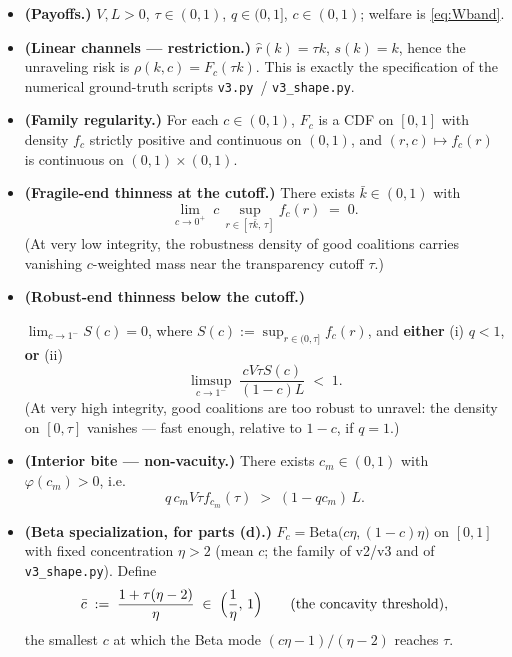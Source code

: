\begin{assumption}\label{ass:band}
\leavevmode
\begin{itemize}
\item[\textbf{(A1)}] \textbf{(Payoffs.)} $V, L > 0$, $\tau \in (0,1)$, $q \in (0,1]$,
  $c \in (0,1)$; welfare is \eqref{eq:Wband}.
\item[\textbf{(A2)}] \textbf{(Linear channels --- restriction.)} $\hat r(k) = \tau k$,
  $s(k) = k$, hence the unraveling risk is $\rho(k,c) = F_c(\tau k)$. This is exactly
  the specification of the numerical ground-truth scripts \texttt{v3.py}~/
  \texttt{v3\_shape.py}.
\item[\textbf{(A3)}] \textbf{(Family regularity.)} For each $c \in (0,1)$, $F_c$ is a
  CDF on $[0,1]$ with density $f_c$ strictly positive and continuous on $(0,1)$, and
  $(r, c) \mapsto f_c(r)$ is continuous on $(0,1) \times (0,1)$.
\item[\textbf{(A4)}] \textbf{(Fragile-end thinness at the cutoff.)} There exists
  $\bar k \in (0,1)$ with
  \[
  \lim_{c \to 0^+} \; c \, \sup_{r \in [\tau\bar k,\, \tau]} f_c(r) \;=\; 0.
  \]
  (At very low integrity, the robustness density of good coalitions carries vanishing
  $c$-weighted mass near the transparency cutoff $\tau$.)
\item[\textbf{(A5)}] \textbf{(Robust-end thinness below the cutoff.)}
  {\sloppy
  $\lim_{c \to 1^-} S(c) = 0$, where $S(c) := \sup_{r \in (0,\tau]} f_c(r)$, and
  \textbf{either} (i) $q < 1$, \textbf{or} (ii)
  \[
  \limsup_{c \to 1^-} \; \frac{cV\tau S(c)}{(1 - c)L} \;<\; 1.
  \]
  (At very high integrity, good coalitions are too robust to unravel: the density on
  $[0, \tau]$ vanishes --- fast enough, relative to $1 - c$, if $q = 1$.)\par}
\item[\textbf{(A6)}] \textbf{(Interior bite --- non-vacuity.)} There exists
  $c_m \in (0,1)$ with $\varphi(c_m) > 0$, i.e.
  \[
  q\, c_m V \tau f_{c_m}(\tau) \;>\; (1 - q c_m)\, L.
  \]
\item[\textbf{(A7)}] \textbf{(Beta specialization, for parts (d).)}
  $F_c = \mathrm{Beta}\bigl(c\eta, (1-c)\eta\bigr)$ on $[0,1]$ with fixed concentration
  $\eta > 2$ (mean $c$; the family of v2/v3 and of \texttt{v3\_shape.py}). Define
  \[
  \bar c \;:=\; \frac{1 + \tau(\eta - 2)}{\eta} \;\in\; \Bigl(\frac{1}{\eta},\, 1\Bigr)
  \qquad \text{(the concavity threshold)},
  \]
  the smallest $c$ at which the Beta mode $(c\eta - 1)/(\eta - 2)$ reaches $\tau$.
\end{itemize}
\end{assumption}

